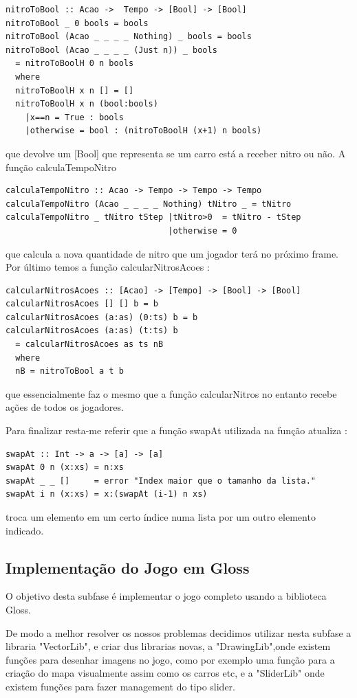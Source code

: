 \documentclass[a4paper]{report} %
\begin{document}
\begin{verbatim}
nitroToBool :: Acao ->  Tempo -> [Bool] -> [Bool]
nitroToBool _ 0 bools = bools
nitroToBool (Acao _ _ _ _ Nothing) _ bools = bools
nitroToBool (Acao _ _ _ _ (Just n)) _ bools
  = nitroToBoolH 0 n bools
  where
  nitroToBoolH x n [] = []
  nitroToBoolH x n (bool:bools)
    |x==n = True : bools
    |otherwise = bool : (nitroToBoolH (x+1) n bools)
\end{verbatim}
que devolve um [Bool] que representa se um carro está a receber nitro ou não. A função calculaTempoNitro

\begin{verbatim}
calculaTempoNitro :: Acao -> Tempo -> Tempo -> Tempo
calculaTempoNitro (Acao _ _ _ _ Nothing) tNitro _ = tNitro
calculaTempoNitro _ tNitro tStep |tNitro>0  = tNitro - tStep
                                 |otherwise = 0
\end{verbatim}
que calcula a nova quantidade de nitro que um jogador terá no próximo frame. Por último temos a função calcularNitrosAcoes : 

\begin{verbatim}
calcularNitrosAcoes :: [Acao] -> [Tempo] -> [Bool] -> [Bool]
calcularNitrosAcoes [] [] b = b
calcularNitrosAcoes (a:as) (0:ts) b = b
calcularNitrosAcoes (a:as) (t:ts) b
  = calcularNitrosAcoes as ts nB
  where
  nB = nitroToBool a t b
\end{verbatim}
que essencialmente faz o mesmo que a função calcularNitros no entanto recebe ações de todos os jogadores.


Para finalizar resta-me referir que a função swapAt utilizada na função atualiza :

\begin{verbatim}
swapAt :: Int -> a -> [a] -> [a]
swapAt 0 n (x:xs) = n:xs
swapAt _ _ []     = error "Index maior que o tamanho da lista."
swapAt i n (x:xs) = x:(swapAt (i-1) n xs)
\end{verbatim}
troca um elemento em um certo índice numa lista por um outro elemento indicado.


\subsection{Implementação do Jogo em Gloss}

O objetivo desta subfase é implementar o jogo completo usando a biblioteca Gloss.


De modo a melhor resolver os nossos  problemas decidimos utilizar nesta subfase a libraria "VectorLib", e criar dus librarias novas, a "DrawingLib",onde existem funções para desenhar imagens no jogo, como por exemplo uma função para a criação do mapa visualmente assim como os carros etc, e a "SliderLib" onde existem funções para fazer management do tipo slider.
\end{document}
